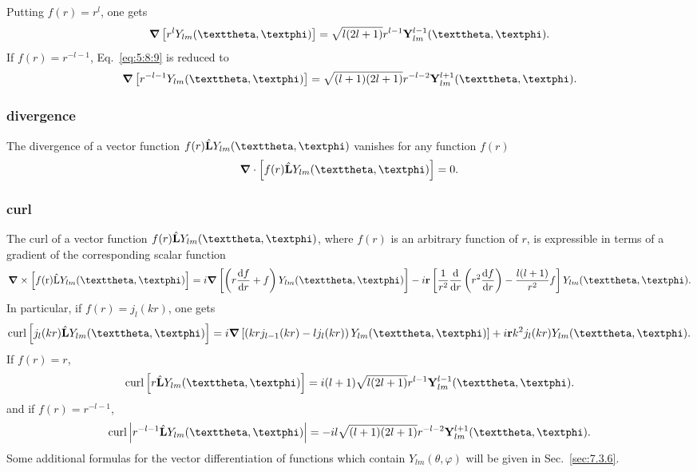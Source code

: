 Putting $f(r)=r^{l}$, one gets
\begin{equation}
\boldsymbol{\nabla}\left[r^{l} Y_{l m}(\vartheta, \varphi)\right]=\sqrt{l(2 l+1)} r^{l-1} \vect{Y}_{l m}^{l-1}(\vartheta, \varphi). \label{eq:5:8:13}
\end{equation}
If $f(r)=r^{-l-1}$, Eq.~\eqref{eq:5:8:9} is reduced to
\begin{equation}
\boldsymbol{\nabla}\left[r^{-l-1} Y_{l m}(\vartheta, \varphi)\right]=\sqrt{(l+1)(2 l+1)} r^{-l-2} \vect{Y}_{l m}^{l+1}(\vartheta, \varphi). \label{eq:5:8:14}
\end{equation}
\subsubsection{divergence}
 The divergence of a vector function $f(r) \hat{\vect{L}} Y_{l m}(\vartheta, \varphi)$ vanishes for any function $f(r)$
\begin{equation}
\boldsymbol{\nabla}\cdot \left[f(r) \hat{\mathrm{\vect{L}}} Y_{l m}(\vartheta, \varphi)\right]=0 . \label{eq:5:8:15}
\end{equation}
\subsubsection{curl}
 The curl of a vector function $f(r) \hat{\vect{L}} Y_{ l m}(\vartheta, \varphi)$, where $f(r)$ is an arbitrary function of $r$, is expressible in terms of a gradient of the corresponding scalar function
\begin{equation}
\boldsymbol{\nabla} \times\left[f(\mathrm{r}) \hat{\mathrm{L}} Y_{l m}(\vartheta, \varphi)\right]=i \boldsymbol{\nabla}\left[\left(r \frac{\dd  f}{\dd  r}+f\right) Y_{l m}(\vartheta, \varphi)\right]-i \vect{r}\left[\frac{1}{r^{2}} \frac{\dd }{\dd  r}\left(r^{2} \frac{\dd  f}{\dd  r}\right)-\frac{l(l+1)}{r^{2}} f\right] Y_{l m}(\vartheta, \varphi) . \label{eq:5:8:16}
\end{equation}
In particular, if $f(r)=j_{l}(k r)$, one gets
\begin{equation}
\curl \left[j_{l}(k r) \hat{\vect{L}} Y_{l m}(\vartheta, \varphi)\right]=i \boldsymbol{\nabla}\left[\left(k r j_{l-1}(k r)-l j_{l}(k r)\right) Y_{l m}(\vartheta, \varphi)\right]+i \vect{r} k^{2} j_{l}(k r) Y_{l m}(\vartheta, \varphi) . \label{eq:5:8:17}
\end{equation}
If $f(r)=r$,
\begin{equation}
\curl \left[r \hat{\vect{L}} Y_{l m}(\vartheta, \varphi)\right]=i(l+1) \sqrt{l(2 l+1)} r^{l-1} \vect{Y}_{l m}^{l-1}(\vartheta, \varphi) . \label{eq:5:8:18}
\end{equation}
and if $f(r)=r^{-l-1}$,
\begin{equation}
\curl \left|r^{-l-1} \hat{\vect{L}} Y_{l m}(\vartheta, \varphi)\right|=-i l \sqrt{(l+1)(2 l+1)} r^{-l-2} \vect{Y}_{l m}^{l+1}(\vartheta, \varphi) . \label{eq:5:8:19}
\end{equation}
Some additional formulas for the vector differentiation of functions which contain $Y_{l m}(\theta, \varphi)$ will be given in Sec.~\ref{sec:7.3.6}.

